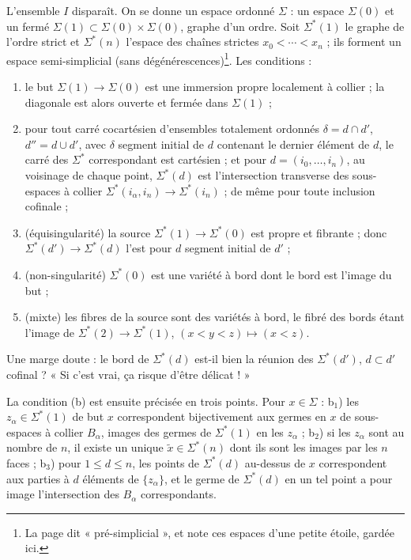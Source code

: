 \documentclass[11pt,a4paper]{article}
\begin{document}
L'ensemble $I$ disparaît. On se donne un espace ordonné $\Sigma$ : un espace
$\Sigma(0)$ et un fermé $\Sigma(1) \subset \Sigma(0) \times \Sigma(0)$, graphe d'un
ordre. Soit $\Sigma^{*}(1)$ le graphe de l'ordre strict et $\Sigma^{*}(n)$ l'espace
des chaînes strictes $x_0 < \cdots < x_n$ ; ils forment un espace semi-simplicial
(sans dégénérescences)\footnote{La page dit « pré-simplicial », et note ces
espaces d'une petite étoile, gardée ici.}. Les conditions :
\begin{enumerate}
\item[(a)] le but $\Sigma(1) \to \Sigma(0)$ est une immersion propre localement à
collier ; la diagonale est alors ouverte et fermée dans $\Sigma(1)$ ;
\item[(b)] pour tout carré cocartésien d'ensembles totalement ordonnés $\delta = d
\cap d'$, $d'' = d \cup d'$, avec $\delta$ segment initial de $d$ contenant le
dernier élément de $d$, le carré des $\Sigma^{*}$ correspondant est cartésien ; et
pour $d = (i_0, …, i_n)$, au voisinage de chaque point, $\Sigma^{*}(d)$ est
l'intersection transverse des sous-espaces à collier $\Sigma^{*}(i_\alpha, i_n) \to
\Sigma^{*}(i_n)$ ; de même pour toute inclusion cofinale ;
\item[(c)] (équisingularité) la source $\Sigma^{*}(1) \to \Sigma^{*}(0)$ est propre et
fibrante ; donc $\Sigma^{*}(d') \to \Sigma^{*}(d)$ l'est pour $d$ segment initial de
$d'$ ;
\item[(d)] (non-singularité) $\Sigma^{*}(0)$ est une variété à bord dont le bord est
l'image du but ;
\item[(e)] (mixte) les fibres de la source sont des variétés à bord, le fibré des
bords étant l'image de $\Sigma^{*}(2) \to \Sigma^{*}(1)$, $(x<y<z) \mapsto (x<z)$.
\end{enumerate}
Une marge doute : le bord de $\Sigma^{*}(d)$ est-il bien la réunion des
$\Sigma^{*}(d')$, $d \subset d'$ cofinal ? « Si c'est vrai, ça risque d'être
délicat ! »

La condition (b) est ensuite précisée en trois points. Pour $x \in \Sigma$ :
b$_1$) les $z_\alpha \in \Sigma^{*}(1)$ de but $x$ correspondent bijectivement aux
germes en $x$ de sous-espaces à collier $B_\alpha$, images des germes de
$\Sigma^{*}(1)$ en les $z_\alpha$ ; b$_2$) si les $z_\alpha$ sont au nombre de $n$, il
existe un unique $\tilde x \in \Sigma^{*}(n)$ dont ils sont les images par les $n$
faces ; b$_3$) pour $1 \leq d \leq n$, les points de $\Sigma^{*}(d)$ au-dessus de $x$
correspondent aux parties à $d$ éléments de $\{z_\alpha\}$, et le germe de
$\Sigma^{*}(d)$ en un tel point a pour image l'intersection des $B_\alpha$
correspondants.
\end{document}
